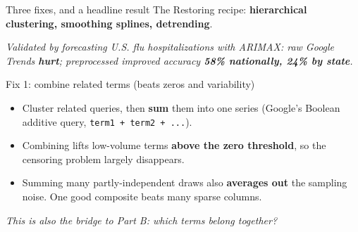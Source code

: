 \documentclass[aspectratio=169,11pt]{beamer}
\begin{document}
\begin{frame}{Three fixes, and a headline result}
  The Restoring recipe: \textbf{hierarchical clustering, smoothing splines, detrending}.
  \begin{center}
  \end{center}
  \vspace{0.2em}
  \begin{center}
    \itshape Validated by forecasting U.S. flu hospitalizations with ARIMAX: raw Google
    Trends \textbf{hurt}; preprocessed improved accuracy \textbf{58\% nationally, 24\% by
    state}.
  \end{center}
\end{frame}

\begin{frame}{Fix 1: combine related terms (beats zeros and variability)}
  \begin{itemize}
    \item Cluster related queries, then \textbf{sum} them into one series (Google's Boolean
          additive query, \texttt{term1 + term2 + ...}).
    \item Combining lifts low-volume terms \textbf{above the zero threshold}, so the
          censoring problem largely disappears.
    \item Summing many partly-independent draws also \textbf{averages out} the sampling
          noise. One good composite beats many sparse columns.
  \end{itemize}
  \vspace{0.3em}
  \begin{center}
    \itshape This is also the bridge to Part B: which terms belong together?
  \end{center}
\end{frame}
\end{document}
